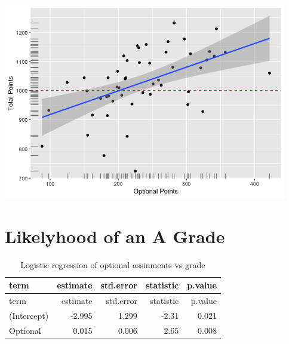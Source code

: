 \documentclass[]{article}
\newenvironment{Shaded}{\begin{snugshade}}{\end{snugshade}}
\newcommand{\KeywordTok}[1]{\textcolor[rgb]{0.13,0.29,0.53}{\textbf{#1}}}
\newcommand{\DataTypeTok}[1]{\textcolor[rgb]{0.13,0.29,0.53}{#1}}
\newcommand{\StringTok}[1]{\textcolor[rgb]{0.31,0.60,0.02}{#1}}
\newcommand{\OperatorTok}[1]{\textcolor[rgb]{0.81,0.36,0.00}{\textbf{#1}}}
\newcommand{\NormalTok}[1]{#1}
\begin{document}
\includegraphics{figures/required-optional-correlations-3.png}

\section{Likelyhood of an A Grade}\label{likelyhood-of-an-a-grade}

\begin{Shaded}
\end{Shaded}

\begin{longtable}[]{@{}lrrrr@{}}
\caption{Logistic regression of optional assinments vs
grade}\tabularnewline
\toprule
term & estimate & std.error & statistic & p.value\tabularnewline
\midrule
\endfirsthead
\toprule
term & estimate & std.error & statistic & p.value\tabularnewline
\midrule
\endhead
(Intercept) & -2.995 & 1.299 & -2.31 & 0.021\tabularnewline
Optional & 0.015 & 0.006 & 2.65 & 0.008\tabularnewline
\bottomrule
\end{longtable}
\end{document}
